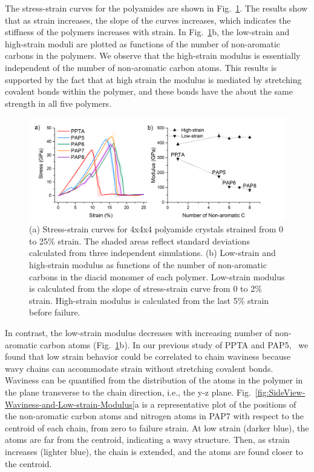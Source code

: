 \documentclass[journal=langd5,manuscript=article]{achemso}
\begin{document}
The stress-strain curves for the polyamides are shown in Fig.~\ref{fig:Stress-strain-Curves-and-Modulus}. 
The results show that as strain increases, the slope of the curves increases, which indicates the stiffness of the polymers increases with strain. 
In Fig.~\ref{fig:Stress-strain-Curves-and-Modulus}b, the low-strain and high-strain moduli are plotted as functions of the number of non-aromatic carbons in the polymers.
We observe that the high-strain modulus is essentially independent of the number of non-aromatic carbon atoms.  This results is supported by the fact that at high strain the modulus is mediated by stretching covalent bonds within the polymer, and these bonds have the about the same strength in all five polymers.
\begin{figure}[h!]
\centering
\includegraphics[scale=0.45]{Stress-strain-Curves-and-Modulus.png}
\caption{(a) Stress-strain curves for 4x4x4 polyamide crystals strained from 0 to 25\% strain. The shaded areas reflect standard deviations calculated from three independent simulations. (b) Low-strain and high-strain modulus as functions of the number of non-aromatic carbons in the diacid monomer of each polymer. Low-strain modulus is calculated from the slope of stress-strain curve from 0 to 2\% strain. High-strain modulus is calculated from the last 5\% strain before failure. }
\label{fig:Stress-strain-Curves-and-Modulus}
\end{figure}


In contrast, the low-strain modulus decreases with increasing number of non-aromatic carbon atoms (Fig.~\ref{fig:Stress-strain-Curves-and-Modulus}b).
In our previous study of PPTA and PAP5,~\cite{yang2021molecular} we found that low strain behavior could be correlated to chain waviness because wavy chains can accommodate strain without stretching covalent bonds.
Waviness can be quantified from the distribution of the atoms in the polymer in the plane transverse to the chain direction, i.e., the y-z plane.
Fig.~\ref{fig:SideView-Waviness-and-Low-strain-Modulus}a is a representative plot of the positions of the non-aromatic carbon atoms and nitrogen atoms in PAP7 with respect to the centroid of each chain, from zero to failure strain.
At low strain (darker blue), the atoms are far from the centroid, indicating a wavy structure.
Then, as strain increases (lighter blue), the chain is extended, and the atoms are found closer to the centroid.
\end{document}
